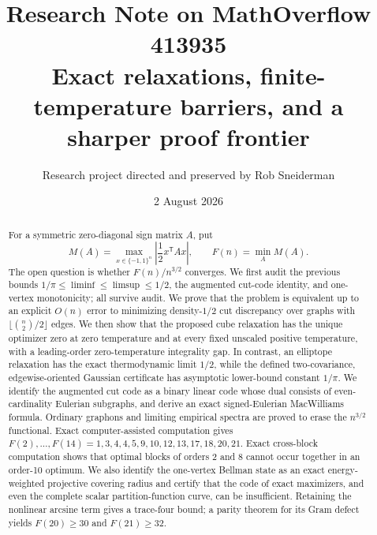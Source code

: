 \documentclass[11pt]{article}
\title{\textbf{Research Note on MathOverflow 413935}\\[4pt]
\large Exact relaxations, finite-temperature barriers, and a sharper proof frontier}
\author{Research project directed and preserved by Rob Sneiderman}
\date{2 August 2026}
\newcommand{\eps}{\{-1,1\}}
\begin{document}
\maketitle

\begin{center}
\end{center}

\begin{abstract}
For a symmetric zero-diagonal sign matrix \(A\), put
\[
 M(A)=\max_{x\in\eps^n}\left|\frac12x^{\mathsf T}Ax\right|,
 \qquad F(n)=\min_A M(A).
\]
The open question is whether \(F(n)/n^{3/2}\) converges.  We first audit the
previous bounds \(1/\pi\le\liminf\le\limsup\le1/2\), the augmented cut-code
identity, and one-vertex monotonicity; all survive audit.  We prove that the
problem is equivalent up to an explicit $O(n)$ error to minimizing
density-$1/2$ cut discrepancy over graphs with
$\lfloor\binom n2/2\rfloor$ edges.  We then show that
the proposed cube relaxation has the unique optimizer zero at zero temperature
and at every fixed unscaled positive temperature, with a leading-order
zero-temperature integrality gap.  In contrast, an elliptope relaxation has
the exact thermodynamic limit \(1/2\), while the defined two-covariance,
edgewise-oriented Gaussian certificate has asymptotic lower-bound constant
\(1/\pi\).
We identify the augmented cut code as a binary linear code whose dual consists
of even-cardinality Eulerian subgraphs, and derive an exact signed-Eulerian
MacWilliams formula.  Ordinary graphons and limiting empirical spectra are
proved to erase the \(n^{3/2}\) functional.  Exact computer-assisted
computation gives
\(F(2),\ldots,F(14)=1,3,4,4,5,9,10,12,13,17,18,20,21\).
Exact cross-block computation
shows that optimal blocks of orders 2 and 8 cannot occur together in an
order-10 optimum.  We also identify the one-vertex Bellman state as an exact
energy-weighted projective covering radius and certify that the code of exact
maximizers, and even the complete scalar partition-function curve, can be
insufficient.  Retaining the nonlinear arcsine term gives a trace-four bound;
a parity theorem for its Gram defect yields $F(20)\ge30$ and $F(21)\ge32$.

\end{abstract}
\end{document}
